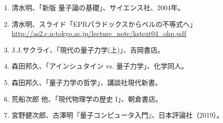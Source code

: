 \documentclass[10pt,b5paper,papersize,dvipdfmx]{jsbook}
\begin{document}

\clearpage

\begin{sanko}
  \begin{enumerate}
    \item 清水明、「新版 量子論の基礎」、サイエンス社、2004年。
    \item 清水明、スライド「EPRパラドックスからベルの不等式へ」\\
      \url{http://as2.c.u-tokyo.ac.jp/lecture_note/kstext04_ohp.pdf}
    \item J.J.サクライ、「現代の量子力学(上)」、吉岡書店。
    \item 森田邦久、「アインシュタイン vs. 量子力学」、化学同人。
    \item 森田邦久、「量子力学の哲学」、講談社現代新書。
    \item 荒船次郎 他、「現代物理学の歴史 I」、朝倉書店。
    \item 宮野健次郎、古澤明『量子コンピュータ入門』、日本評論社（2019）。
  \end{enumerate}
\end{sanko}
\end{document}
